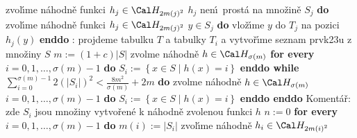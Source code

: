 \phantom{------------}zvol\'\i me n\'ahodn\v e funkci $
h_j\in \Cal H_{2m\left(j\right)^2}$\newline
\phantom{------------}{\bf while} $h_j$ nen\'\i\ prost\'a na mno\v zin\v e $
S_j$ {\bf do}\newline
\phantom{---------------}zvol\'\i me n\'ahodn\v e funkci $h_j\in \Cal H_{2m\left(j\right)^2}$\newline
\phantom{------------}{\bf enddo}\newline
\phantom{------------}{\bf for every} $y\in S_j$ {\bf do} vlo\v z\'\i me $
y$ do $T_j$ na pozici $h_j\left(y\right)$ {\bf enddo}\newline 
\phantom{---------}{\bf endif}\newline 
\phantom{------}{\bf endif}\newline 
\phantom{---}{\bf else}\newline 
\phantom{------}{\bf RehashAll}\newline
\phantom{---}{\bf endif\newline 
endif
skip

\flushpar RehashAll}:\newline 
projdeme tabulku $T$ a tabulky $T_i$ a vytvo\v r\'\i me seznam 
prvk\accent23u z mno\v ziny $S$\newline 
$m:=\left(1+c\right)|S|$\newline 
zvolme n\'ahodn\v e $h\in \Cal H_{\sigma \left(m\right)}$ \newline 
{\bf for every} $i=0,1,\dots,\sigma \left(m\right)-1$ {\bf do} $S_i:=\left\{x\in S\mid h\left(x\right)=i\right\}$ {\bf enddo\newline
while} $\sum_{i=0}^{\sigma \left(m\right)-1}2\left(|S_i|\right)^2<\frac {8m^2}{\sigma \left(
m\right)}+2m$ {\bf do}\newline
\phantom{---}zvolme n\'ahodn\v e $h\in \Cal H_{\sigma \left(m\right)}$ \newline 
\phantom{---}{\bf for every} $i=0,1,\dots,\sigma \left(m\right)-1$ {\bf do} $S_i:=\left\{x\in S\mid h\left(x\right)=i\right\}$ {\bf enddo\newline
enddo}
Koment\'a\v r: zde $S_i$ jsou mno\v ziny vytvo\v ren\'e k n\'ahodn\v e zvolenou 
funkci $h$ \newline 
$n:=0$ \newline 
{\bf for every} $i=0,1,\dots,\sigma \left(m\right)-1$ {\bf do}\newline
\phantom{---}$m\left(i\right):=|S_i|$\newline 
\phantom{---}zvol\'\i me n\'ahodn\v e $h_i\in \Cal H_{2m\left(i\right)^2}$\newline 
